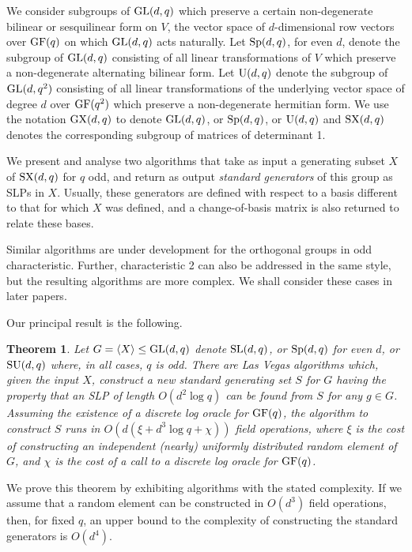 \documentclass[12pt]{article}
\newtheorem{theorem}[definition]{Theorem}
\def\SL{{\rm SL}}
\def\GL{{\rm GL}}
\def\U{{\rm U}}
\def\GF{{\rm GF}}
\def\Sp{{\rm Sp}}
\def\SU{{\rm SU}}
\def\SX{{\rm SX}}
\def\GX{{\rm GX}}
\begin{document}
We consider subgroups of $\GL(d, q)$  which
preserve a certain non-degenerate bilinear or sesquilinear
form on $V$, the vector space of $d$-dimensional
row vectors over $\GF (q)$ on which $\GL(d, q)$  acts
naturally.  Let $\Sp (d, q)$, for even $d$, denote the
subgroup of $\GL(d,q)$ consisting of all linear 
transformations of $V$ which preserve 
a non-degenerate alternating bilinear form.
Let $\U(d, q)$  denote the subgroup of 
$\GL(d,q^2)$ consisting of all linear 
transformations of the underlying vector space of 
degree $d$ over $\GF(q^2)$ which preserve 
a non-degenerate hermitian form.
We use the notation $\GX(d,q)$ 
to denote $\GL(d,q)$, or $\Sp(d,q)$, or $\U(d,q)$
and $\SX(d, q)$ denotes the corresponding subgroup of 
matrices of determinant 1. 

We present and analyse two algorithms that
take as input a generating subset $X$ of $\SX(d,q)$ for $q$ odd, and
return as output {\it standard generators} of this group as 
SLPs in $X$. Usually, these  
generators are defined with respect to a 
basis different to that for which $X$ was defined, 
and a change-of-basis 
matrix is also returned to relate these bases.

Similar algorithms are under development for the orthogonal groups
in odd characteristic.  Further, characteristic 2 can also be 
addressed in the same style, but the resulting algorithms are more complex.
We shall consider these cases in later papers.

Our principal result is the following.
\begin{theorem} \label{main}
Let $G = \langle X \rangle \leq \GL(d, q)$ denote 
$\SL(d,q)$, or $\Sp(d,q)$ for even $d$, or $\SU(d,q)$
where, in all cases, $q$ is odd. 
There are Las Vegas algorithms which,
given the input $X$, 
construct a new standard generating set $S$ 
for $G$ having the property that 
an SLP of length $O(d^2 \log q)$
can be found from $S$ for any $g \in G$. 
Assuming the existence of a discrete log oracle 
for $\GF (q)$, the algorithm to construct
$S$ runs in $O(d (\xi + d^3 \log q + \chi))$ field operations, 
where $\xi$ is the cost of constructing an independent 
(nearly) uniformly distributed random element of $G$,
and $\chi$ is the cost of a call to a discrete log oracle for $\GF(q)$.
\end{theorem}

We prove this theorem by exhibiting algorithms
with the stated complexity. If we assume that
a random element can be constructed in 
$O(d^3)$ field operations, then, for fixed $q$,
an upper bound to the complexity of constructing 
the standard generators is $O(d^4)$. 
\end{document}
